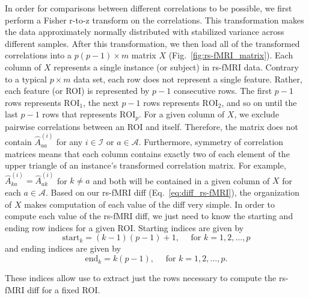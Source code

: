 \documentclass[aoas]{imsart}
\begin{document}
In order for comparisons between different correlations to be possible, we first perform a Fisher r-to-z transform on the correlations. This transformation makes the data approximately normally distributed with stabilized variance across different samples. After this transformation, we then load all of the transformed correlations into a $p(p-1) \times m$ matrix $X$ (Fig.~\ref{fig:rs-fMRI_matrix}). Each column of $X$ represents a single instance (or subject) in rs-fMRI data. Contrary to a typical $p \times m$ data set, each row does not represent a single feature. Rather, each feature (or ROI) is represented by $p - 1$ consecutive rows. The first $p - 1$ rows represents $\text{ROI}_1$, the next $p - 1$ rows represents $\text{ROI}_2$, and so on until the last $p - 1$ rows that represents $\text{ROI}_p$. For a given column of $X$, we exclude pairwise correlations between an ROI and itself. Therefore, the matrix does not contain $\hat{A}^{(i)}_{aa}$ for any $i \in \mathcal{I}$ or $a \in \mathcal{A}$. Furthermore, symmetry of correlation matrices means that each column contains exactly two of each element of the upper triangle of an instance's transformed correlation matrix. For example, $\hat{A}^{(i)}_{ka} = \hat{A}^{(i)}_{ak}$ for $k \neq a$ and both will be contained in a given column of $X$ for each $a \in \mathcal{A}$. Based on our rs-fMRI diff (Eq.~\ref{eq:diff_rs-fMRI}), the organization of $X$ makes computation of each value of the diff very simple. In order to compute each value of the rs-fMRI diff, we just need to know the starting and ending row indices for a given ROI. Starting indices are given by
%
\[
\text{start}_k = (k - 1)(p - 1) + 1, \quad \text{ for } k = 1,2,\dots,p
\]
%
and ending indices are given by
%
\[
\text{end}_k = k(p - 1), \quad \text{ for } k = 1,2,\dots,p.
\]

These indices allow use to extract just the rows necessary to compute the rs-fMRI diff for a fixed ROI. 
\end{document}
